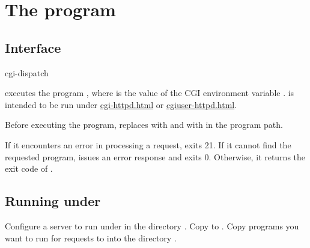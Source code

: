 
\chapter{The  program}

\section{Interface}
\begin{code}
  cgi-dispatch
\end{code}

 executes the program , where
 is the value of the CGI environment variable .
 is intended to be run under
\href{\cmd{cgi-httpd}}{cgi-httpd.html} or
\href{\cmd{cgiuser-httpd}}{cgiuser-httpd.html}.

Before executing the program,  replaces \cmd{//} with \cmd{/}
and  with \cmd{/:} in the program path.

If it encounters an error in processing a request,  exits 21.
If it cannot find the requested program,  issues an error
response and exits 0.  Otherwise, it returns the exit code of .

\section{Running under }
Configure a server to run  under  in the
directory .  Copy  to .  Copy programs
you want  to run for requests to  into the
directory .


